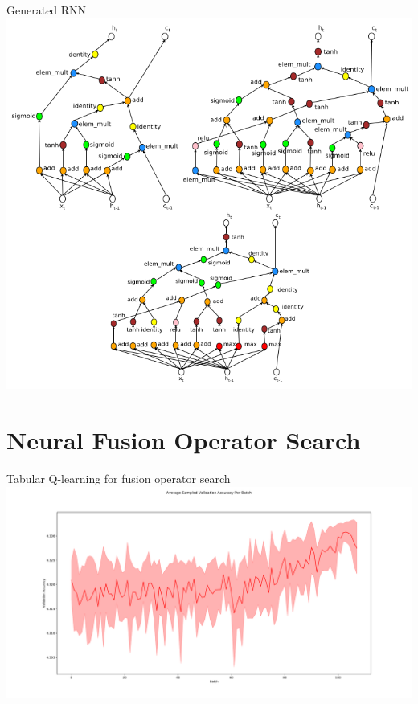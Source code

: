 \documentclass{beamer}
\begin{document}
{%
\begin{frame}{Generated RNN}
        \center{}
        \vspace{-0.25cm}
        \includegraphics[scale=0.32]{data/neural_arch_rnn_output}
\end{frame}
}


\section{Neural Fusion Operator Search}

{%
\begin{frame}{Tabular Q-learning for fusion operator search}
\centering
\hspace*{-12mm}
\includegraphics[width=1.2\textwidth]{data/val_accuracy_per_batch.pdf}
\end{frame}
}
\end{document}
